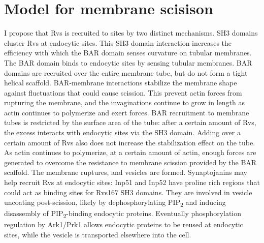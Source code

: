 \section{Model for membrane scisison}
I propose that Rvs is recruited to sites by two distinct mechanisms. SH3 domains cluster Rvs at endocytic sites. This SH3 domain interaction increases the efficiency with which the BAR domain senses curvature on tubular membranes. The BAR domain binds to endocytic sites by sensing tubular membranes. BAR domains are recruited over the entire membrane tube, but do not form a tight helical scaffold. BAR-membrane interactions stabilize the membrane shape against fluctuations that could cause scission. This prevent actin forces from rupturing the membrane, and the invaginations continue to grow in length as actin continues to polymerize and exert forces. BAR recruitment to membrane tubes is restricted by the surface area of the tube: after a certain amount of Rvs, the excess interacts with endocytic sites via the SH3 domain. Adding over a certain amount of Rvs also does not increase the stabilization effect on the tube. As actin continues to polymerize, at a certain amount of actin, enough forces are generated to overcome the resistance to membrane scission provided by the BAR scaffold. The membrane ruptures, and vesicles are formed. Synaptojanins may help recruit Rvs at endocytic sites: Inp51 and Inp52 have proline rich regions that could act as binding sites for Rvs167 SH3 domains. They are involved in vesicle uncoating post-scission, likely by dephosphorylating 	PIP\textsubscript{2} and inducing disassembly of 	PIP\textsubscript{2}-binding endocytic proteins. Eventually phosphorylation regulation by Ark1/Prk1 allows endocytic proteins to be reused at endocytic sites, while the vesicle is transported elsewhere into the cell. 






